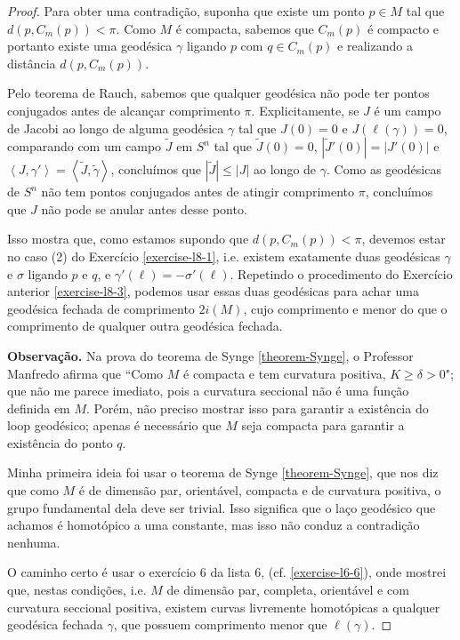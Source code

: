 \begin{proof}
Para obter uma contradição, suponha que existe um ponto $p \in M$ tal que
 $d(p, C_m(p))<\pi$. Como $M$ é compacta, sabemos que $C_m(p)$ é compacto e
portanto existe uma geodésica $\gamma$ ligando $p$ com $q \in C_m(p)$ e
realizando a distância $d(p,C_m(p))$.

Pelo teorema de Rauch, sabemos que qualquer geodésica não pode ter pontos
conjugados antes de alcançar comprimento $\pi$. Explicitamente, se $J$ é um
campo de Jacobi ao longo de alguma geodésica $\gamma$ tal que $J(0)=0$ e 
$J(\ell(\gamma))=0$, comparando com um campo $\tilde{J}$ em $S^n$ tal que
 $\tilde{J}(0)=0$, $|\tilde{J}'(0)|=|J'(0)|$ e 
$\left<J,\gamma'\right>=\left<\tilde{J},\tilde{\gamma}\right>$, concluímos que
 $|\tilde{J}|\leq |J|$ ao longo de $\gamma$. Como as geodésicas de $S^n$ não
 tem pontos conjugados antes de atingir comprimento $\pi$, concluímos que 
$J$ não pode se anular antes desse ponto.

Isso mostra que, como estamos supondo que $d(p,C_m(p))<\pi$, devemos estar no
caso (2) do Exercício \ref{exercise-l8-1}, i.e. existem exatamente duas
geodésicas $\gamma$ e $\sigma$ ligando $p$ e $q$, e
$\gamma'(\ell)=-\sigma'(\ell)$. Repetindo o procedimento do Exercício anterior
 \ref{exercise-l8-3}, podemos usar essas duas geodésicas para achar uma 
geodésica fechada de comprimento $2i(M)$, cujo comprimento e menor do que o
comprimento de qualquer outra geodésica fechada.

{\bf Observação.} Na prova do teorema de Synge \ref{theorem-Synge}, o Professor
Manfredo afirma que ``Como $M$ é compacta e tem curvatura positiva, $K\geq
\delta>0$"; que não me parece imediato, pois a curvatura seccional não é uma
função definida em $M$. Porém, não preciso mostrar isso para garantir a
existência do loop geodésico; apenas é necessário que $M$ seja compacta para
garantir a existência do ponto $q$.

Minha primeira ideia foi usar o teorema de Synge \ref{theorem-Synge}, 
que nos diz que como $M$ é de dimensão par, orientável, compacta e de 
curvatura positiva, o grupo fundamental dela deve ser trivial. 
Isso significa que o laço geodésico que achamos é homotópico a uma constante,
mas isso não conduz a contradição nenhuma.

O caminho certo é usar o exercício 6 da lista 6, (cf.
\ref{exercise-l6-6}), onde mostrei que, nestas condições, i.e. $M$ de dimensão
par, completa, orientável e com curvatura seccional positiva, existem curvas
livremente homotópicas a qualquer geodésica fechada $\gamma$, que possuem
comprimento menor que $\ell(\gamma)$.


\end{proof}
